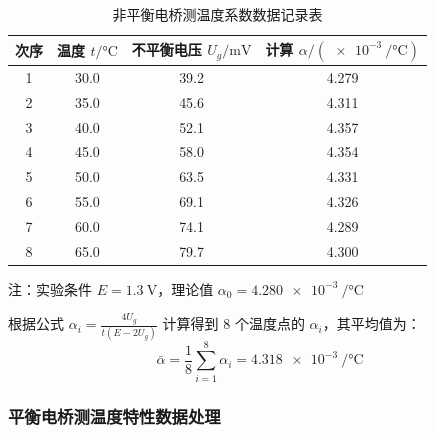 \documentclass{../template/Report}%
\begin{document}
\begin{fullreportonly}
    \begin{table}[H]
        \centering
        \caption{非平衡电桥测温度系数数据记录表}
        \label{tab:non_equilibrium}
        \begin{tabular}{cccc}
            \toprule
            次序 & 温度 $t / \si{\degreeCelsius}$ & 不平衡电压 $U_g / \si{\milli\volt}$ & 计算 $\alpha / (\SI{e-3}{\per\degreeCelsius})$ \\
            \midrule
            1  & 30.0                         & 39.2                           & 4.279                                        \\
            2  & 35.0                         & 45.6                           & 4.311                                        \\
            3  & 40.0                         & 52.1                           & 4.357                                        \\
            4  & 45.0                         & 58.0                           & 4.354                                        \\
            5  & 50.0                         & 63.5                           & 4.331                                        \\
            6  & 55.0                         & 69.1                           & 4.326                                        \\
            7  & 60.0                         & 74.1                           & 4.289                                        \\
            8  & 65.0                         & 79.7                           & 4.300                                        \\
            \bottomrule
        \end{tabular}
        \par\vspace{1mm}
        {\footnotesize * 注：实验条件 $E = \SI{1.3}{\volt}$，理论值 $\alpha_{0} = \SI{4.280e-3}{\per\degreeCelsius}$}
    \end{table}

    根据公式 $\alpha_i = \frac{4U_g}{t(E-2U_g)}$ 计算得到 8 个温度点的 $\alpha_i$，其平均值为：
    \begin{equation}
        \bar{\alpha} = \frac{1}{8}\sum_{i=1}^{8}\alpha_i = \SI{4.318e-3}{\per\degreeCelsius}
    \end{equation}

    \subsubsection{平衡电桥测温度特性数据处理}


\end{fullreportonly}
\end{document}
